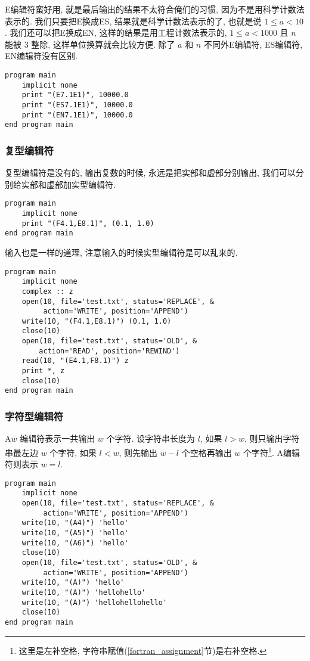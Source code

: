 E编辑符蛮好用, 就是最后输出的结果不太符合俺们的习惯, 因为不是用科学计数法表示的. 我们只要把E换成ES, 结果就是科学计数法表示的了, 也就是说 $ 1\leqslant a<10 $. 我们还可以把E换成EN, 这样的结果是用工程计数法表示的, $ 1\leqslant a<1000 $ 且 $ n $ 能被 $ 3 $ 整除, 这样单位换算就会比较方便. 除了 $ a $ 和 $ n $ 不同外E编辑符, ES编辑符, EN编辑符没有区别. 
\begin{lstlisting}
program main
    implicit none
    print "(E7.1E1)", 10000.0
    print "(ES7.1E1)", 10000.0
    print "(EN7.1E1)", 10000.0
end program main
\end{lstlisting}

\subsubsection{复型编辑符}

复型编辑符是没有的, 输出复数的时候, 永远是把实部和虚部分别输出, 我们可以分别给实部和虚部加实型编辑符. 
\begin{lstlisting}
program main
    implicit none
    print "(F4.1,E8.1)", (0.1, 1.0)
end program main
\end{lstlisting}
输入也是一样的道理, 注意输入的时候实型编辑符是可以乱来的. 
\begin{lstlisting}
program main
    implicit none
    complex :: z
    open(10, file='test.txt', status='REPLACE', &
         action='WRITE', position='APPEND')
    write(10, "(F4.1,E8.1)") (0.1, 1.0)
    close(10)
    open(10, file='test.txt', status='OLD', &
        action='READ', position='REWIND')
    read(10, "(E4.1,F8.1)") z
    print *, z
    close(10)
end program main
\end{lstlisting}

\subsubsection{字符型编辑符}

A$ w $ 编辑符表示一共输出 $ w $ 个字符. 设字符串长度为 $ l $, 如果 $ l>w $, 则只输出字符串最左边 $ w $ 个字符, 如果 $ l<w $, 则先输出 $ w-l $ 个空格再输出 $ w $ 个字符\footnote{这里是左补空格, 字符串赋值(\ref{fortran_assignment}节)是右补空格.}. A编辑符则表示 $ w=l $. 
\begin{lstlisting}
program main
    implicit none
    open(10, file='test.txt', status='REPLACE', &
         action='WRITE', position='APPEND')
    write(10, "(A4)") 'hello'
    write(10, "(A5)") 'hello'
    write(10, "(A6)") 'hello'
    close(10)
    open(10, file='test.txt', status='OLD', &
         action='WRITE', position='APPEND')
    write(10, "(A)") 'hello'
    write(10, "(A)") 'hellohello'
    write(10, "(A)") 'hellohellohello'
    close(10)
end program main
\end{lstlisting}

